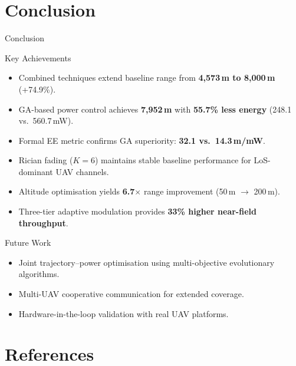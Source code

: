 \documentclass[aspectratio=169, 11pt]{beamer}
\begin{document}
\section{Conclusion}

\begin{frame}{Conclusion}
\begin{block}{Key Achievements}
\begin{itemize}
  \item Combined techniques extend baseline range from \textbf{4,573\,m to 8,000\,m} (+74.9\%).
  \item GA-based power control achieves \textbf{7,952\,m} with \textbf{55.7\% less energy} (248.1 vs.\ 560.7\,mW).
  \item Formal EE metric confirms GA superiority: \textbf{32.1 vs.\ 14.3\,m/mW}.
  \item Rician fading ($K\!=\!6$) maintains stable baseline performance for LoS-dominant UAV channels.
  \item Altitude optimisation yields \textbf{6.7$\times$} range improvement (50\,m $\to$ 200\,m).
  \item Three-tier adaptive modulation provides \textbf{33\% higher near-field throughput}.
\end{itemize}
\end{block}

\vspace{0.3cm}

\begin{exampleblock}{Future Work}
\begin{itemize}
  \item Joint trajectory--power optimisation using multi-objective evolutionary algorithms.
  \item Multi-UAV cooperative communication for extended coverage.
  \item Hardware-in-the-loop validation with real UAV platforms.
\end{itemize}
\end{exampleblock}
\end{frame}

\section{References}
\end{document}
